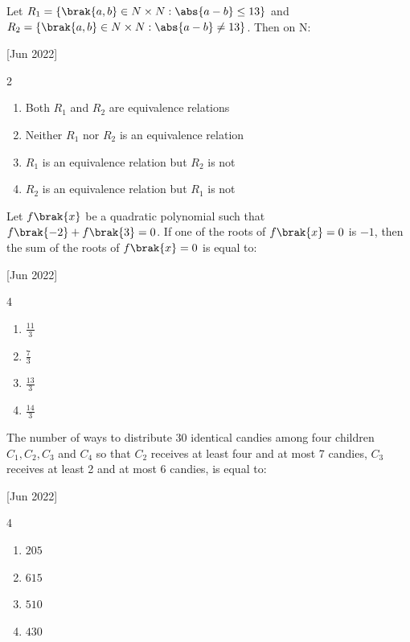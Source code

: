  
    \item Let $R_1=\{\brak{a,b}\in N\times N: \abs{a-b}\leq13\}$ and $R_2=\{\brak{a,b}\in N\times N: \abs{a-b}\neq13\}$. Then on N:
    
    \hfill{[Jun 2022]}

        \begin{multicols}{2}
            \begin{enumerate}
                \item Both $R_1$ and $R_2$ are equivalence relations
                \item Neither $R_1$ nor $R_2$ is an equivalence relation
                \item $R_1$ is an equivalence relation but $R_2$ is not
                \item $R_2$ is an equivalence relation but $R_1$ is not
            \end{enumerate}
        \end{multicols}

    \item Let $f\brak{x}$ be a quadratic polynomial such that $f\brak{-2}+f\brak{3}=0$. If one of the roots of $f\brak{x}=0$ is $-1$, then the sum of the roots of $f\brak{x}=0$ is equal to:
    
    \hfill{[Jun 2022]}

		\begin{multicols}{4}
			\begin{enumerate}
				\item $\frac{11}{3}$
				\item $\frac{7}{3}$
				\item $\frac{13}{3}$
				\item $\frac{14}{3}$
			\end{enumerate}
		\end{multicols}

    \item The number of ways to distribute 30 identical candies among four children $C_1,C_2,C_3$ and $C_4$ so that $C_2$ receives at least four and at most 7 candies, $C_3$ receives at least 2 and at most 6 candies, is equal to:
    
    \hfill{[Jun 2022]}

        \begin{multicols}{4}
            \begin{enumerate}
                \item $205$
                \item $615$
                \item $510$
                \item $430$
            \end{enumerate}
        \end{multicols}

